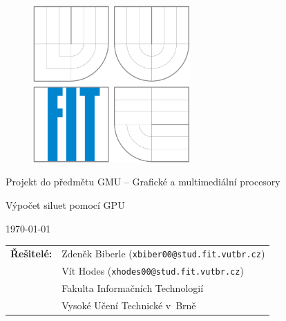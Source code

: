 \begin{titlepage}

\vspace*{1cm}

\begin{figure}
  \centering
  \includegraphics[height=6cm]{images/fit.pdf}
\end{figure}

\vspace*{5mm}

\begin{center}
\begin{Large}
Projekt do předmětu GMU -- Grafické a multimediální procesory
\end{Large}
\end{center}

\vspace*{5mm}

\begin{center}
\begin{Huge}
Výpočet siluet pomocí GPU \\
\end{Huge}
\end{center}

\vspace*{1cm}

\begin{center}
\begin{Large}
\today
\end{Large}
\end{center}

\vfill

\begin{flushleft}
\begin{large}
\begin{tabular}{ll}

\bf Řešitelé:\hspace{3mm} & Zdeněk Biberle (\verb_xbiber00@stud.fit.vutbr.cz_) \\
& Vít Hodes (\verb_xhodes00@stud.fit.vutbr.cz_) \\
& Fakulta Informačních Technologií \\
& Vysoké Učení Technické v~Brně

\end{tabular}
\end{large}
\end{flushleft}

\end{titlepage}

